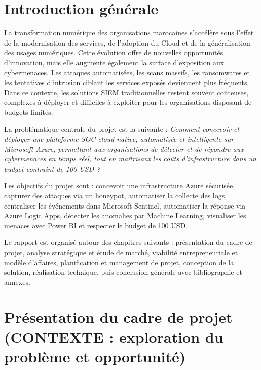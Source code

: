 \documentclass[11pt,a4paper]{report}
\begin{document}
\chapter*{Introduction générale}

La transformation numérique des organisations marocaines s'accélère sous l'effet de la modernisation des services, de l'adoption du Cloud et de la généralisation des usages numériques. Cette évolution offre de nouvelles opportunités d'innovation, mais elle augmente également la surface d'exposition aux cybermenaces. Les attaques automatisées, les scans massifs, les ransomwares et les tentatives d'intrusion ciblant les services exposés deviennent plus fréquents. Dans ce contexte, les solutions SIEM traditionnelles restent souvent coûteuses, complexes à déployer et difficiles à exploiter pour les organisations disposant de budgets limités.

La problématique centrale du projet est la suivante : \textit{Comment concevoir et déployer une plateforme SOC cloud-native, automatisée et intelligente sur Microsoft Azure, permettant aux organisations de détecter et de répondre aux cybermenaces en temps réel, tout en maîtrisant les coûts d'infrastructure dans un budget contraint de 100 USD ?}

Les objectifs du projet sont : concevoir une infrastructure Azure sécurisée, capturer des attaques via un honeypot, automatiser la collecte des logs, centraliser les événements dans Microsoft Sentinel, automatiser la réponse via Azure Logic Apps, détecter les anomalies par Machine Learning, visualiser les menaces avec Power BI et respecter le budget de 100 USD.

Le rapport est organisé autour des chapitres suivants : présentation du cadre de projet, analyse stratégique et étude de marché, viabilité entrepreneuriale et modèle d'affaires, planification et management de projet, conception de la solution, réalisation technique, puis conclusion générale avec bibliographie et annexes.

\chapter{Présentation du cadre de projet (CONTEXTE : exploration du problème et opportunité)}
\end{document}
